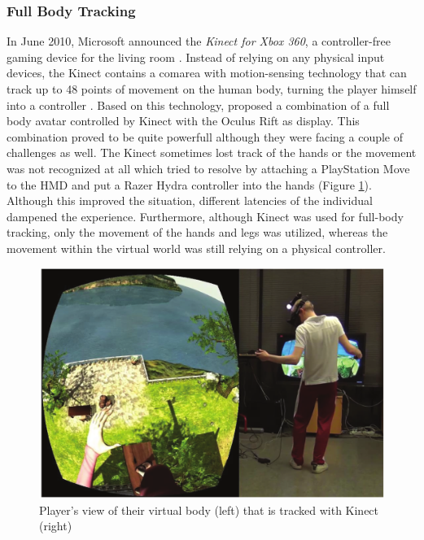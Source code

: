 \subsubsection{Full Body Tracking}

In June 2010, Microsoft announced the \textit{Kinect for Xbox 360}, a controller-free gaming device for the living room \citep{Microsoft2010}. Instead of relying on any physical input devices, the Kinect contains a comarea with motion-sensing technology that can track up to 48 points of movement on the human body, turning the player himself into a controller \citep{Microsoft2010}. \newline
Based on this technology, \cite{Takala2014} proposed a combination of a full body avatar controlled by Kinect with the Oculus Rift as display. This combination proved to be quite powerfull although they were facing a couple of challenges as well. The Kinect sometimes lost track of the hands or the movement was not recognized at all which \cite{Takala2014} tried to resolve by attaching a PlayStation Move to the HMD and put a Razer Hydra controller into the hands (Figure \ref{fig:kinectbody}). Although this improved the situation, different latencies of the individual dampened the experience. Furthermore, although Kinect was used for full-body tracking, only the movement of the hands and legs was utilized, whereas the movement within the virtual world was still relying on a physical controller.
\begin{figure}[h]
	\begin{center}
		\includegraphics[width=12cm]{03_Figures/05_LitReview/Takala2014_KinectBody.png}
		\caption[Player's view of their virtual body that is tracked with Kinect]{Player's view of their virtual body (left) that is tracked with Kinect (right) \citep{Takala2014}}
		\label{fig:kinectbody}
	\end{center}
\end{figure}


